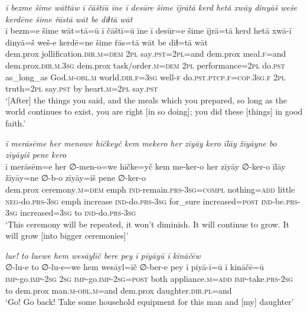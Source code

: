 \ea \label{ŽP.244}
\textit{ī bezme šime wāttāw ī čāštīū īne ī desūre šime ījrātā kerd hetā xwāy dinyāš weše kerdēne šime řāstā wāt be diɫtā wāt} \\ 
\gll ī bezm=e šime wāt=tā=ū ī čāštī=ū īne ī desūr=e šime ījrā=tā kerd hetā xwā-ī dinyā=š weš-e kerdē=ne šime řās=tā wāt be diɫ=tā wāt \\ 
 dem.prox jollification\textsc{.dir}\textsc{.m}\textsc{=dem} \textsc{2pl} say\textsc{.pst}=\textsc{2pl}=and dem.prox meal\textsc{.f}=and dem.prox\textsc{.dir}\textsc{.m}\textsc{.3sg} dem.prox task/order\textsc{.m}\textsc{=dem} \textsc{2pl} performance=\textsc{2pl} do\textsc{.pst} as\_long\_as God\textsc{.m}\textsc{-obl}\textsc{.m} world\textsc{.dir}\textsc{.f}\textsc{=3sg} well\textsc{-f} do\textsc{.pst}\textsc{.ptcp}\textsc{.f}\textsc{=cop}\textsc{.3sg}\textsc{.f} \textsc{2pl} truth=\textsc{2pl} say\textsc{.pst} by heart\textsc{.m}=\textsc{2pl} say\textsc{.pst} \\ 
\glt `[After] the things you said, and the meals which you prepared, so long as the world continues to exist, you are right [in so doing]; you did these [things] in good faith.'
\z 
 
\ea \label{ŽP.245}
\textit{ī merāsēme her menowe hīčkeyč kem mekero her zīyāy kero īlāy žīyāyne bo zīyāyiš pene kero} \\ 
\gll ī merāsēm=e her ∅-men-o=we hīčke=yč kem me-ker-o her zīyāy ∅-ker-o īlāy žīyāy=ne ∅-b-o zīyāy=iš pene ∅-ker-o \\ 
 dem.prox ceremony\textsc{.m}\textsc{=dem} emph \textsc{ind-}remain\textsc{.prs}\textsc{-3sg}\textsc{=compl} nothing\textsc{=add} little \textsc{neg-}do\textsc{.prs}\textsc{-3sg} emph increase \textsc{ind-}do\textsc{.prs}\textsc{-3sg} for\_sure increased\textsc{=\textsc{post}} \textsc{ind-}be\textsc{.prs}\textsc{-3sg} increased\textsc{=3sg} to \textsc{ind-}do\textsc{.prs}\textsc{-3sg} \\ 
\glt `This ceremony will be repeated, it won’t diminish. It will continue to grow. It will grow [into bigger ceremonies]'
\z 
 
\ea \label{ŽP.262}
\textit{lue! to luewe hem wesāylīč bere pey ī pīyāyū ī kināčēw} \\ 
\gll ∅-lu-e to ∅-lu-e=we hem wesāyl=īč ∅-ber-e pey ī pīyā-ī=ū ī kināčē=ū \\ 
 \textsc{imp-}go.\textsc{imp-}\textsc{2sg} \textsc{2sg} \textsc{imp-}go.\textsc{imp-}\textsc{2sg}\textsc{=\textsc{post}} both appliance\textsc{.m}\textsc{=add} \textsc{imp-}take\textsc{.prs}-\textsc{2sg} to dem.prox man\textsc{.m}\textsc{-obl}\textsc{.m}=and dem.prox daughter\textsc{.dir}\textsc{.pl}=and \\ 
\glt `Go! Go back! Take some household equipment for this man and [my] daughter'
\z 
 
